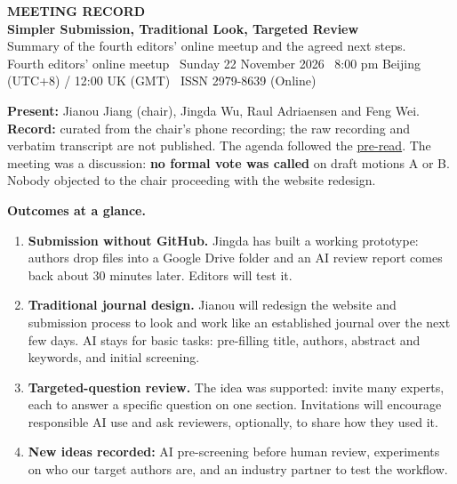 \documentclass[11pt]{article}
\begin{document}
\begin{tcolorbox}[colback=darkbg,colframe=darkbg,arc=3pt,left=18pt,right=18pt,top=14pt,bottom=14pt]
  {\sffamily\footnotesize\color{accent}\bfseries MEETING RECORD}\\[4pt]
  {\sffamily\LARGE\bfseries\color{white} Simpler Submission, Traditional Look, Targeted Review}\\[5pt]
  {\sffamily\small\color{white!75} Summary of the fourth editors' online meetup and the agreed next steps.}\\[8pt]
  {\sffamily\footnotesize\color{white!60} Fourth editors' online meetup \textbullet\ Sunday 22 November 2026 \textbullet\ 8:00 pm Beijing (UTC+8) / 12:00 UK (GMT) \textbullet\ ISSN 2979-8639 (Online)}
\end{tcolorbox}

\vspace{4pt}
{\small\color{ink2}\textbf{Present:} Jianou Jiang (chair), Jingda Wu, Raul Adriaensen and Feng Wei. \textbf{Record:} curated from the chair's phone recording; the raw recording and verbatim transcript are not published. The agenda followed the \href{https://ai-driven-energy-research.github.io/aider-fourth-editors-meetup-pre-read-2026-11-22.pdf}{pre-read}. The meeting was a discussion: \textbf{no formal vote was called} on draft motions A or B. Nobody objected to the chair proceeding with the website redesign.}

\begin{solvebox}
\textbf{Outcomes at a glance.}
\begin{enumerate}
  \item \textbf{Submission without GitHub.} Jingda has built a working prototype: authors drop files into a Google Drive folder and an AI review report comes back about 30 minutes later. Editors will test it.
  \item \textbf{Traditional journal design.} Jianou will redesign the website and submission process to look and work like an established journal over the next few days. AI stays for basic tasks: pre-filling title, authors, abstract and keywords, and initial screening.
  \item \textbf{Targeted-question review.} The idea was supported: invite many experts, each to answer a specific question on one section. Invitations will encourage responsible AI use and ask reviewers, optionally, to share how they used it.
  \item \textbf{New ideas recorded:} AI pre-screening before human review, experiments on who our target authors are, and an industry partner to test the workflow.
\end{enumerate}
\end{solvebox}
\end{document}

